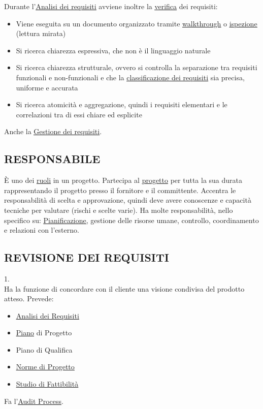 		Durante l'\underline{\hyperref[analisideirequisiti]{Analisi dei requisiti}} avviene inoltre la \underline{\hyperref[verificare]{verifica}} dei requisiti:
			\begin{itemize}
				\item Viene eseguita su un documento organizzato tramite \underline{\hyperref[walkthrough]{walkthrough}} o \underline{\hyperref[inspection]{ispezione}} (lettura mirata)
				\item Si ricerca chiarezza espressiva, che non è il linguaggio naturale
				\item Si ricerca chiarezza strutturale, ovvero si controlla la separazione tra requisiti funzionali e non-funzionali e che la \underline{\hyperref[classificazione]{classificazione dei requisiti}} sia precisa, uniforme e accurata
				\item Si ricerca atomicità e aggregazione, quindi i requisiti elementari e le correlazioni tra di essi chiare ed esplicite
			\end{itemize}

		Anche la \underline{\hyperref[gestionerequisiti]{Gestione dei requisiti}}.

		\subsection{RESPONSABILE}  \label{responsabile}
		È uno dei \underline{\hyperref[ruoli]{ruoli}} in un progetto. Partecipa al \underline{\hyperref[progetto]{progetto}} per tutta la sua durata rappresentando il progetto presso il fornitore e il committente. Accentra le responsabilità di scelta e approvazione, quindi deve avere conoscenze e capacità tecniche per valutare (rischi e scelte varie). Ha molte responsabilità, nello specifico su: \underline{\hyperref[pianificazione]{Pianificazione}}, gestione delle risorse umane, controllo, coordinamento e relazioni con l'esterno.

		\subsection{REVISIONE DEI REQUISITI}  \label{RR}
		1. \\
		Ha la funzione di concordare con il cliente una visione condivisa del prodotto atteso.
		Prevede:
		\begin{itemize}
			\item \underline{\hyperref[analisideirequisiti]{Analisi dei Requisiti}}
			\item \underline{\hyperref[piano]{Piano}} di Progetto
			\item Piano di Qualifica
			\item \underline{\hyperref[norme]{Norme di Progetto}}
			\item \underline{\hyperref[studiofattibilita]{Studio di Fattibilità}}
		\end{itemize}
		Fa l'\underline{\hyperref[audit]{Audit Process}}.

